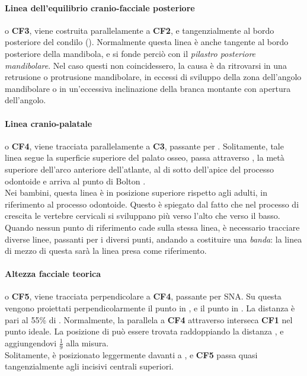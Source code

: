 \paragraph{Linea dell'equilibrio cranio-facciale posteriore} o \textbf{CF3}, viene costruita parallelamente a \textbf{CF2}, e tangenzialmente al bordo posteriore del condilo (). Normalmente questa linea è anche tangente al bordo posteriore della mandibola, e si fonde perciò con il \emph{pilastro posteriore mandibolare}. Nel caso questi non coincidessero, la causa è da ritrovarsi in una retrusione o protrusione mandibolare, in eccessi di sviluppo della zona dell'angolo mandibolare o in un'eccessiva inclinazione della branca montante con apertura dell'angolo.

\paragraph{Linea cranio-palatale} o \textbf{CF4}, viene tracciata parallelamente a \textbf{C3}, passante per . Solitamente, tale linea segue la superficie superiore del palato osseo, passa attraverso , la metà superiore dell'arco anteriore dell'atlante, al di sotto dell'apice del processo odontoide e arriva al punto di Bolton .\\
Nei bambini, questa linea è in posizione superiore rispetto agli adulti, in riferimento al processo odontoide. Questo è spiegato dal fatto che nel processo di crescita le vertebre cervicali si sviluppano più verso l'alto che verso il basso.\\
Quando nessun punto di riferimento cade sulla stessa linea, è necessario tracciare diverse linee, passanti per i diversi punti, andando a costituire una \emph{banda}: la linea di mezzo di questa sarà la linea presa come riferimento.

\paragraph{Altezza facciale teorica} o \textbf{CF5}, viene tracciata perpendicolare a \textbf{CF4}, passante per SNA. Su questa vengono proiettati perpendicolarmente il punto  in , e il punto  in . La distanza  è pari al 55\% di . Normalmente, la parallela a \textbf{CF4} attraverso  interseca \textbf{CF1} nel punto  ideale. La posizione di  può essere trovata raddoppiando la distanza , e aggiungendovi $\frac{1}{9}$ alla misura.\\
Solitamente,  è posizionato leggermente davanti a , e \textbf{CF5} passa quasi tangenzialmente agli incisivi centrali superiori.


